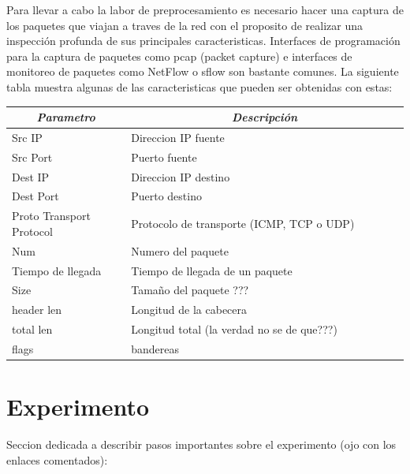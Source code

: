 \documentclass[12pt]{article}
\begin{document}
Para llevar a cabo la labor de preprocesamiento es necesario hacer una captura de los paquetes que viajan a traves de la red con el proposito de realizar una inspección profunda de sus principales caracteristicas. Interfaces de programación para la captura de paquetes como pcap (packet capture) e interfaces de monitoreo de paquetes como NetFlow o sflow son bastante comunes. La siguiente tabla muestra algunas de las caracteristicas que pueden ser obtenidas con estas:

\begin{table}[htbp]
\centering
\begin{tabular}{|p{0.3\linewidth}|p{0.7\linewidth}|}
\hline
\multicolumn{1}{|c|}{\textit{\textbf{Parametro}}} & \multicolumn{1}{c|}{\textit{\textbf{Descripción}}} \tabularnewline \hline
Src IP & Direccion IP fuente \tabularnewline \hline
Src Port &  Puerto fuente \tabularnewline \hline  
Dest IP & Direccion IP destino \tabularnewline \hline
Dest Port & Puerto destino \tabularnewline \hline
Proto Transport Protocol & Protocolo de transporte  (ICMP, TCP o UDP)  \tabularnewline \hline
Num & Numero del paquete \tabularnewline \hline
Tiempo de llegada & Tiempo de llegada de un paquete \tabularnewline \hline
Size & Tamaño del paquete ??? \tabularnewline \hline
header len & Longitud de la cabecera \tabularnewline \hline
total len & Longitud total (la verdad no se de que???) \tabularnewline \hline
flags & bandereas \tabularnewline \hline
\end{tabular}
\end{table}

\section{Experimento}

Seccion dedicada a describir pasos importantes sobre el experimento (ojo con los enlaces comentados):


\end{document}
